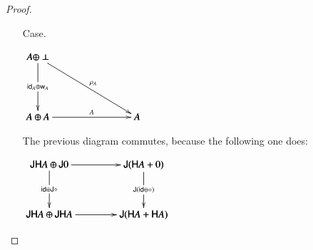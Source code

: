 \documentclass{lmcs}
\let\c\relax
\let\j\relax
\let\wn\relax
\newcommand{\cat}[1]{\mathcal{#1}}
\newcommand{\func}[1]{\mathsf{#1}}
\newcommand{\id}[0]{\mathsf{id}}
\newcommand{\w}[1]{\mathsf{w}_{#1}}
\newcommand{\c}[1]{\mathsf{c}_{#1}}
\newcommand{\j}[1]{\mathsf{j}_{#1}}
\newcommand{\wn}[0]{\mathop{?}}
\newcommand{\codiag}[1]{\bigtriangledown_{#1}}
\newenvironment{diagram}{
  \begin{center}
    \begin{math}
      \bfig
}{
      \efig
    \end{math}
  \end{center}
}
\begin{document}
\begin{proof}
\begin{itemize}
\begin{diagram}
      \square(950,0)|amma|/->``->`->/<950,500>[
        \func{JH}A \oplus (\func{JH}A \oplus \func{JH}A)`
        \func{JH}A \oplus \func{J}(\func{H}A + \func{H}A)`
        \func{J}((\func{H}A + \func{H}A) + \func{H}A)`
        \func{J}(\func{H}A + (\func{H}A + \func{H}A));
        \id \oplus \j{}``
        \j{}`
        \func{J}\alpha]

      \square(1900,0)|amma|/->``->`->/<950,500>[
        \func{JH}A \oplus \func{J}(\func{H}A + \func{H}A)`
        \func{JH}A \oplus \func{JH}A`
        \func{J}(\func{H}A + (\func{H}A + \func{H}A))`
        \func{J}(\func{H}A + \func{H}A);
        \id \oplus \func{J}\codiag{}``
        \j{}`
        \func{J}(\id + \codiag{})]

      \square(0,-500)|amma|/`->`->`->/<950,500>[
        \func{J}(\func{H}A + \func{H}A) \oplus \func{JH}A`
        \func{J}((\func{H}A + \func{H}A) + \func{H}A)`
        \func{JH}A \oplus \func{JH}A`
        \func{J}(\func{H}A + \func{H}A);`
        \func{J}\codiag{} \oplus \id`
        \func{J}(\codiag{} + \id)`
        \j{}]

      \dtriangle(950,-500)|ama|/`->`->/<1900,500>[
        \func{J}(\func{H}A + \func{H}A)`
        \func{J}(\func{H}A + \func{H}A)`
        \func{JH}A;`
        \func{J}\codiag{}`
        \func{J}\codiag{}]

      \place(950,250)[(1)]
      \place(2375,250)[(2)]
      \place(475,-250)[(3)]
      \place(1900,-250)[(4)]
    \end{diagram}
    Diagram 1 commutes because $\func{J}$ is a symmetric monoidal
    functor, diagrams 2 and 3 commute by naturality of $\j{}$, and
    diagram 4 commutes because $(\func{H}A, \diamond, \codiag{})$ is a
    commutative monoid in $\cat{C}$, but we leave the proof of this to
    the reader.

  \item[Case.]\ \\
    \begin{diagram}
      \btriangle|maa|/->`->`->/<1000,600>[
        \wn A \oplus \perp`
        \wn A \oplus \wn A`
        \wn A;
        \id_{\wn A} \oplus \w{A}`
        \rho_{\wn A}`
        \c{A}]
    \end{diagram}
    The previous diagram commutes, because the following one does:
    \begin{diagram}
      \square|amma|/->`->`->`->/<950,500>[
        \func{JH}A \oplus \func{J}0`
        \func{J}(\func{H}A + 0)`
        \func{JH}A \oplus \func{JH}A`
        \func{J}(\func{H}A + \func{H}A);
        \j{}`
        \id \oplus \func{J}\diamond`
        \func{J}(\id \oplus \diamond)`
        \j{}]


\end{diagram}
\end{itemize}
\end{proof}
\end{document}
